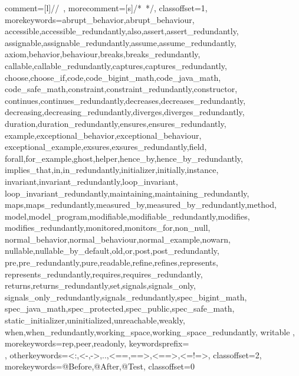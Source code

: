        {%
        comment=[l]{//\ },
        morecomment=[s]{/*\ }{*/},
        classoffset=1,
        morekeywords={abrupt_behavior,abrupt_behaviour,
         accessible,accessible_redundantly,also,assert,assert_redundantly,
         assignable,assignable_redundantly,assume,assume_redundantly,
         axiom,behavior,behaviour,breaks,breaks_redundantly,
         callable,callable_redundantly,captures,captures_redundantly,
         choose,choose_if,code,code_bigint_math,code_java_math,
         code_safe_math,constraint,constraint_redundantly,constructor,
         continues,continues_redundantly,decreases,decreases_redundantly,
         decreasing,decreasing_redundantly,diverges,diverges_redundantly,
         duration,duration_redundantly,ensures,ensures_redundantly,
         example,exceptional_behavior,exceptional_behaviour,
         exceptional_example,exsures,exsures_redundantly,field,
         forall,for_example,ghost,helper,hence_by,hence_by_redundantly,
         implies_that,in,in_redundantly,initializer,initially,instance,
         invariant,invariant_redundantly,loop_invariant,
         loop_invariant_redundantly,maintaining,maintaining_redundantly,
         maps,maps_redundantly,measured_by,measured_by_redundantly,method,
         model,model_program,modifiable,modifiable_redundantly,modifies,
         modifies_redundantly,monitored,monitors_for,non_null,
         normal_behavior,normal_behaviour,normal_example,nowarn,
         nullable,nullable_by_default,old,or,post,post_redundantly,
         pre,pre_redundantly,pure,readable,refine,refines,represents,
         represents_redundantly,requires,requires_redundantly,
         returns,returns_redundantly,set,signals,signals_only,
         signals_only_redundantly,signals_redundantly,spec_bigint_math,
         spec_java_math,spec_protected,spec_public,spec_safe_math,
         static_initializer,uninitialized,unreachable,weakly,
         when,when_redundantly,working_space,working_space_redundantly,
         writable
        },
        morekeywords={rep,peer,readonly},
        keywordsprefix=\\,
        otherkeywords={<:,<-,->,..,<==,==>,<==>,<=!=>},
        classoffset=2,
        morekeywords={@Before,@After,@Test},
        classoffset=0 %
}
